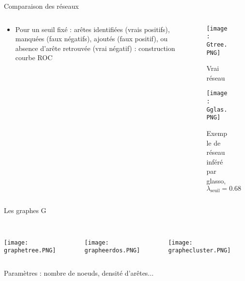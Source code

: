 \documentclass[11pt]{bredelebeamer}
\begin{document}
  \begin{frame}{Comparaison des réseaux}
  \begin{columns}
   \begin{column}{0.5\linewidth}
    \begin{itemize}
         \item Pour un seuil fixé : arêtes identifiées (vrais positifs),  manquées (faux négatifs), ajoutés (faux positif), ou absence d'arête retrouvée (vrai négatif) : construction courbe ROC \\\vspace{0.5cm}
     \end{itemize}
   \end{column}
   \begin{column}{0.5\linewidth}
   \begin{figure}
      
       \texttt{[image: Gtree.PNG]}
       \caption{Vrai réseau}
   \end{figure}
   \begin{figure}
      
       \texttt{[image: Gglas.PNG]}
       \caption{Exemple de réseau inféré par glasso, $\lambda_\text{seuil} = 0.68$}
   \end{figure}
   \end{column}
  \end{columns}
 \end{frame}
 
 
 \begin{frame}{Les graphes G}
     
     \begin{columns}
     \begin{column}{0.3\linewidth}
     \\
     \texttt{[image: graphetree.PNG]}
     \end{column}
     \begin{column}{0.3\linewidth}
     \\
      \texttt{[image: grapheerdos.PNG]}
     \end{column}
     \begin{column}{0.3\linewidth}
     \\
      \texttt{[image: graphecluster.PNG]}
     \end{column}
     \end{columns}
     \vspace{1cm}
     Paramètres : nombre de noeuds, densité d'arêtes...
 \end{frame}
\end{document}
